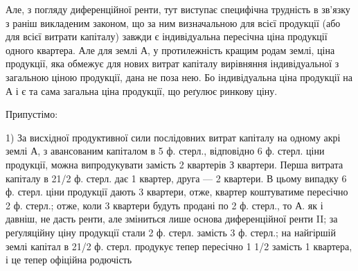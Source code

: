 Але, з погляду диференційної ренти, тут виступає специфічна трудність
в зв’язку з раніш викладеним законом, що за ним визначальною для всієї продукції
(або для всієї витрати капіталу) завжди є індивідуальна пересічна ціна
продукції одного квартера. Але для землі А, у протилежність кращим родам
землі, ціна продукції, яка обмежує для нових витрат капіталу вирівняння індивідуальної
з загальною ціною продукції, дана не поза нею. Бо індивідуальна ціна
продукції на А і є та сама загальна ціна продукції, що реґулює ринкову ціну.

Припустімо:

1) За висхідної продуктивної сили послідовних витрат
капіталу на одному акрі землі А, з авансованим капіталом в 5 ф. стерл.,
відповідно 6 ф. стерл. ціни продукції, можна випродукувати замість 2 квартерів
З квартери. Перша витрата капіталу в 21/2 ф. стерл. дає 1 квартер, друга — 2 квартери. В цьому
випадку 6 ф. стерл. ціни продукції дають 3 квартери,
отже, квартер коштуватиме пересічно 2 ф. стерл.; отже, коли 3 квартери
будуть продані по 2 ф. стерл., то А. як і давніш, не дасть ренти, але зміниться
лише основа диференційної ренти II; за реґуляційну ціну продукції стали
2 ф. стерл. замість 3 ф. стерл.; на найгіршій землі капітал в 21/2 ф. стерл.
продукує тепер пересічно 1 1/2 замість 1 квартера, і це тепер офіційна родючість
\parbreak{}  %
